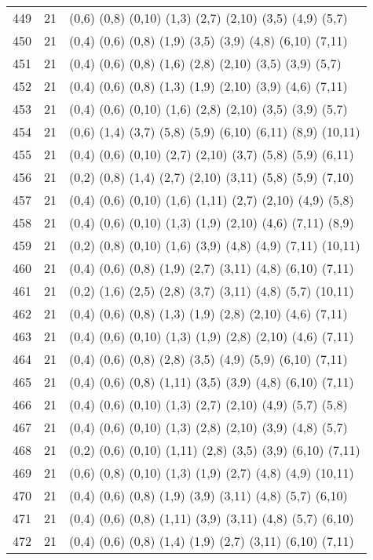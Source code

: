 {\begin{longtable}{lll}
449 & 21 & (0,6) (0,8) (0,10) (1,3) (2,7) (2,10) (3,5) (4,9) (5,7) \\
450 & 21 & (0,4) (0,6) (0,8) (1,9) (3,5) (3,9) (4,8) (6,10) (7,11) \\
451 & 21 & (0,4) (0,6) (0,8) (1,6) (2,8) (2,10) (3,5) (3,9) (5,7) \\
452 & 21 & (0,4) (0,6) (0,8) (1,3) (1,9) (2,10) (3,9) (4,6) (7,11) \\
453 & 21 & (0,4) (0,6) (0,10) (1,6) (2,8) (2,10) (3,5) (3,9) (5,7) \\
454 & 21 & (0,6) (1,4) (3,7) (5,8) (5,9) (6,10) (6,11) (8,9) (10,11) \\
455 & 21 & (0,4) (0,6) (0,10) (2,7) (2,10) (3,7) (5,8) (5,9) (6,11) \\
456 & 21 & (0,2) (0,8) (1,4) (2,7) (2,10) (3,11) (5,8) (5,9) (7,10) \\
457 & 21 & (0,4) (0,6) (0,10) (1,6) (1,11) (2,7) (2,10) (4,9) (5,8) \\
458 & 21 & (0,4) (0,6) (0,10) (1,3) (1,9) (2,10) (4,6) (7,11) (8,9) \\
459 & 21 & (0,2) (0,8) (0,10) (1,6) (3,9) (4,8) (4,9) (7,11) (10,11) \\
460 & 21 & (0,4) (0,6) (0,8) (1,9) (2,7) (3,11) (4,8) (6,10) (7,11) \\
461 & 21 & (0,2) (1,6) (2,5) (2,8) (3,7) (3,11) (4,8) (5,7) (10,11) \\
462 & 21 & (0,4) (0,6) (0,8) (1,3) (1,9) (2,8) (2,10) (4,6) (7,11) \\
463 & 21 & (0,4) (0,6) (0,10) (1,3) (1,9) (2,8) (2,10) (4,6) (7,11) \\
464 & 21 & (0,4) (0,6) (0,8) (2,8) (3,5) (4,9) (5,9) (6,10) (7,11) \\
465 & 21 & (0,4) (0,6) (0,8) (1,11) (3,5) (3,9) (4,8) (6,10) (7,11) \\
466 & 21 & (0,4) (0,6) (0,10) (1,3) (2,7) (2,10) (4,9) (5,7) (5,8) \\
467 & 21 & (0,4) (0,6) (0,10) (1,3) (2,8) (2,10) (3,9) (4,8) (5,7) \\
468 & 21 & (0,2) (0,6) (0,10) (1,11) (2,8) (3,5) (3,9) (6,10) (7,11) \\
469 & 21 & (0,6) (0,8) (0,10) (1,3) (1,9) (2,7) (4,8) (4,9) (10,11) \\
470 & 21 & (0,4) (0,6) (0,8) (1,9) (3,9) (3,11) (4,8) (5,7) (6,10) \\
471 & 21 & (0,4) (0,6) (0,8) (1,11) (3,9) (3,11) (4,8) (5,7) (6,10) \\
472 & 21 & (0,4) (0,6) (0,8) (1,4) (1,9) (2,7) (3,11) (6,10) (7,11) \\

\end{longtable}}
